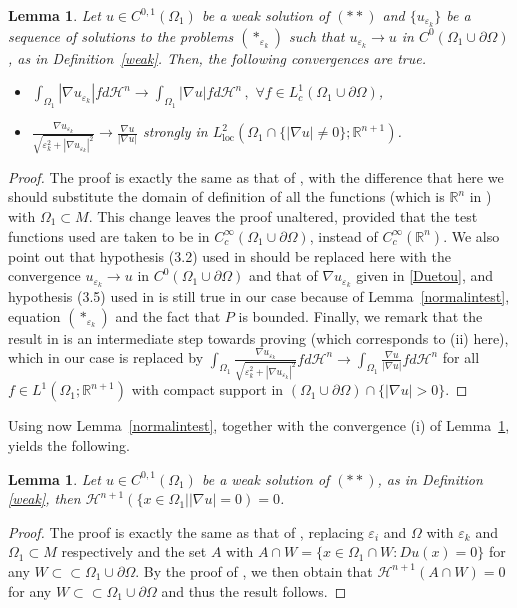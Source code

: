 \documentclass[11pt]{amsart}
\newtheorem{Lemma}[Theorem]{Lemma}
\renewcommand{\epsilon}{\varepsilon}
\def\R{\mathbb{R}}
\def\e{\epsilon}
\def\H{\mathcal{H}}
\def\loc{\text{loc}}
\begin{document}
\begin{Lemma}\label{ES conv} Let $u\in C^{0,1}(\Omega_1)$ be a weak solution of $(**)$ and  $\{u_{\e_k}\}$ be a sequence of solutions to the problems $(*_{\varepsilon_k})$ such that
$ u_{\varepsilon_k}\to u$  in $C^0({\Omega_1}\cup\partial\Omega)$,
as in Definition~\ref{weak}. Then,  the following convergences are true.
\begin{itemize}
\item[(i)] 
$\int_{\Omega_1}|\nabla u_{\e_k}| fd\H^n\to \int_{\Omega_1}|\nabla u| fd\H^n\,,\,\,\forall f\in L^1_c(\Omega_1\cup\partial\Omega)$,

\item[(ii)]$\frac{\nabla u_{\e_k}}{\sqrt{\e_k^2+|\nabla u_{\e_k}|^2}}\to\frac {\nabla u}{|\nabla u|}$ \quad strongly in $L^2_\loc(\Omega_1\cap \{|\nabla u|\ne 0\};\R^{n+1})$.
\end{itemize}
\end{Lemma}
\begin{proof} The proof is exactly the same as that of \cite[Theorems 3.1, 3.2 and 3.3]{ES4}, with the difference that here we should substitute the domain of definition of all the functions (which is $\R^n$ in \cite{ES4}) with  $\Omega_1\subset M$. This change leaves the proof unaltered, provided that the test functions used are taken to be in $C^\infty_c(\Omega_1\cup \partial\Omega)$, instead of  $C^\infty_c(\R^n)$. We also point out  that hypothesis (3.2) used in \cite{ES4} should be replaced here with the  convergence $ u_{\varepsilon_k}\to u$  in $C^0({\Omega_1}\cup\partial\Omega)$ and that of $\nabla u_{\e_k}$ given in  \eqref{Duetou}, and hypothesis (3.5) used in \cite{ES4} is still true in our case because of Lemma~\ref{normalintest}, equation $(*_{\e_k})$ and the fact that $P$ is bounded. Finally, we remark that the result in \cite[Theorem 3.2]{ES4} is an intermediate step towards proving  \cite[Theorem 3.3]{ES4} (which corresponds to (ii) here), which in our case is replaced by
$\int_{\Omega_1}\frac{\nabla u_{\e_k}}{\sqrt{\e_k^2+|\nabla u_{\e_k}|^2}}fd\H^n\to \int_{\Omega_1}\frac {\nabla u}{|\nabla u|} fd\H^n$
for all  $f\in L^1(\Omega_1;\R^{n+1})$ with compact support in $(\Omega_1\cup\partial\Omega)\cap\{|\nabla u|>0\}$.
\end{proof}

Using now Lemma~\ref{normalintest}, together with the convergence (i) of Lemma~\ref{ES conv}, yields the following.
\begin{Lemma} \label{nonfaten}  Let $u\in C^{0,1}(\Omega_1)$ be a weak solution of $(**)$, as in Definition~ \ref{weak}, then $\H^{n+1}(\{x\in \Omega_1||\nabla u|= 0)=0$. 
\end{Lemma}
\begin{proof}
The proof is exactly the same as that of \cite[Lemma 2.3]{MS}, replacing  $\e_i$ and $\Omega$ with $\e_k$  and $\Omega_1\subset M$ respectively and the set $A$ with $A\cap W=\{x\in\Omega_1\cap W:Du(x)=0\}$ for any $W\subset\subset\Omega_1\cup\partial\Omega$. By the proof of   \cite[Lemma 2.3]{MS}, we then obtain that $\H^{n+1}(A\cap W)=0$ for any $W\subset\subset\Omega_1\cup\partial\Omega$ and thus the result follows.
\end{proof}
\end{document}
